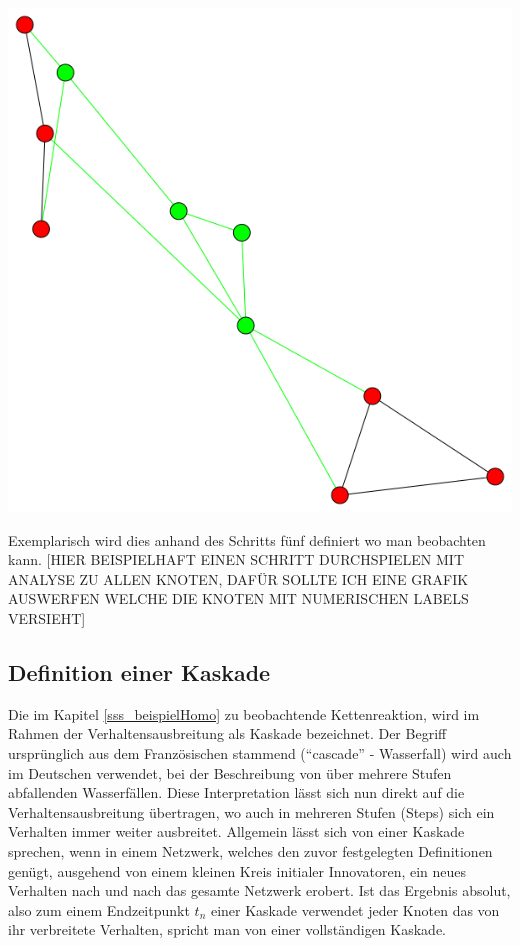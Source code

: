\documentclass[12pt]{article}
\begin{document}
\begin{minipage}[t]{0.3\textwidth}
\includegraphics[width=\textwidth]{cascadeHomo/cascade1.png}
\end{minipage}

Exemplarisch wird dies anhand des Schritts fünf definiert wo man beobachten kann. [HIER BEISPIELHAFT EINEN SCHRITT DURCHSPIELEN MIT ANALYSE ZU ALLEN KNOTEN, DAFÜR SOLLTE ICH EINE GRAFIK AUSWERFEN WELCHE DIE KNOTEN MIT NUMERISCHEN LABELS VERSIEHT]

\subsection{Definition einer Kaskade}
Die im Kapitel \ref{sss_beispielHomo} zu beobachtende Kettenreaktion, wird im Rahmen der Verhaltensausbreitung als Kaskade bezeichnet. Der Begriff ursprünglich aus dem Französischen stammend ("`cascade"' - Wasserfall) wird auch im Deutschen verwendet, bei der Beschreibung von über mehrere Stufen abfallenden Wasserfällen. Diese Interpretation lässt sich nun direkt auf die Verhaltensausbreitung übertragen, wo auch in mehreren Stufen (Steps) sich ein Verhalten immer weiter ausbreitet. Allgemein lässt sich von einer Kaskade sprechen, wenn in einem Netzwerk, welches den zuvor festgelegten Definitionen genügt, ausgehend von einem kleinen Kreis initialer Innovatoren, ein neues Verhalten nach und nach das gesamte Netzwerk erobert. Ist das Ergebnis absolut, also zum einem Endzeitpunkt $t_n$ einer Kaskade verwendet jeder Knoten das von ihr verbreitete Verhalten, spricht man von einer vollständigen Kaskade.
\end{document}
